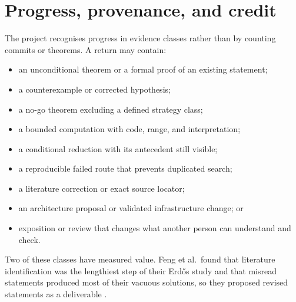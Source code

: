 \documentclass[10pt]{article}
\begin{document}
\section{Progress, provenance, and credit}\label{sec:credit}

The project recognises progress in evidence classes rather than by counting
commits or theorems.  A return may contain:

\begin{itemize}
\item an unconditional theorem or a formal proof of an existing statement;
\item a counterexample or corrected hypothesis;
\item a no-go theorem excluding a defined strategy class;
\item a bounded computation with code, range, and interpretation;
\item a conditional reduction with its antecedent still visible;
\item a reproducible failed route that prevents duplicated search;
\item a literature correction or exact source locator;
\item an architecture proposal or validated infrastructure change; or
\item exposition or review that changes what another person can understand
      and check.
\end{itemize}

Two of these classes have measured value.  Feng et al.\ found that
literature identification was the lengthiest step of their Erd\H{o}s study
and that misread statements produced most of their vacuous solutions, so they
proposed revised statements as a deliverable \cite{aletheia}.
\end{document}

